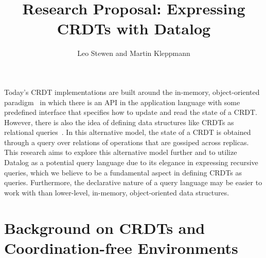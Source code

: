 \documentclass{article}
\begin{document}
\title{Research Proposal: Expressing CRDTs with Datalog}
\author{Leo Stewen and Martin Kleppmann}

\maketitle

Today's CRDT implementations are built around the in-memory,
object-oriented paradigm~\cite{laddad2022keep} in which there is an API
in the application language with some predefined interface that
specifies how to update and read the state of a CRDT.
However, there is also the idea of defining data structures like CRDTs
as relational queries~\cite{kleppmann2018data}.
In this alternative model, the state of a CRDT is obtained through a query over
relations of operations that are gossiped across replicas.
This research aims to explore this alternative model further and
to utilize Datalog as a potential query language due to its elegance in
expressing recursive queries, which we believe to be a fundamental aspect in
defining CRDTs as queries.
Furthermore, the declarative nature of a query language may be easier to work
with than lower-level, in-memory, object-oriented data structures.

\section{Background on CRDTs and Coordination-free Environments}
\end{document}
